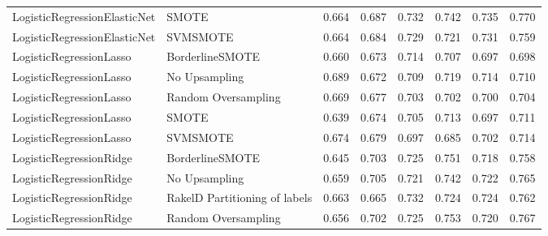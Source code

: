 \begin{tabular}{llllllll}
   LogisticRegressionElasticNet &                         SMOTE & 0.664 &                     0.687 &                 0.732 &                  0.742 &                                   0.735 &    0.770 \\
   LogisticRegressionElasticNet &                      SVMSMOTE & 0.664 &                     0.684 &                 0.729 &                  0.721 &                                   0.731 &    0.759 \\
        LogisticRegressionLasso &               BorderlineSMOTE & 0.660 &                     0.673 &                 0.714 &                  0.707 &                                   0.697 &    0.698 \\
        LogisticRegressionLasso &                 No Upsampling & 0.689 &                     0.672 &                 0.709 &                  0.719 &                                   0.714 &    0.710 \\
        LogisticRegressionLasso &           Random Oversampling & 0.669 &                     0.677 &                 0.703 &                  0.702 &                                   0.700 &    0.704 \\
        LogisticRegressionLasso &                         SMOTE & 0.639 &                     0.674 &                 0.705 &                  0.713 &                                   0.697 &    0.711 \\
        LogisticRegressionLasso &                      SVMSMOTE & 0.674 &                     0.679 &                 0.697 &                  0.685 &                                   0.702 &    0.714 \\
        LogisticRegressionRidge &               BorderlineSMOTE & 0.645 &                     0.703 &                 0.725 &                  0.751 &                                   0.718 &    0.758 \\
        LogisticRegressionRidge &                 No Upsampling & 0.659 &                     0.705 &                 0.721 &                  0.742 &                                   0.722 &    0.765 \\
        LogisticRegressionRidge & RakelD Partitioning of labels & 0.663 &                     0.665 &                 0.732 &                  0.724 &                                   0.724 &    0.762 \\
        LogisticRegressionRidge &           Random Oversampling & 0.656 &                     0.702 &                 0.725 &                  0.753 &                                   0.720 &    0.767 \\

\end{tabular}
